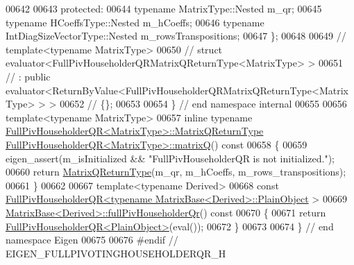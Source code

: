 \begin{DoxyCode}
00642 
00643 \textcolor{keyword}{protected}:
00644   \textcolor{keyword}{typename} MatrixType::Nested m\_qr;
00645   \textcolor{keyword}{typename} HCoeffsType::Nested m\_hCoeffs;
00646   \textcolor{keyword}{typename} IntDiagSizeVectorType::Nested m\_rowsTranspositions;
00647 \};
00648 
00649 \textcolor{comment}{// template<typename MatrixType>}
00650 \textcolor{comment}{// struct evaluator<FullPivHouseholderQRMatrixQReturnType<MatrixType> >}
00651 \textcolor{comment}{//  : public evaluator<ReturnByValue<FullPivHouseholderQRMatrixQReturnType<MatrixType> > >}
00652 \textcolor{comment}{// \{\};}
00653 
00654 \} \textcolor{comment}{// end namespace internal}
00655 
00656 \textcolor{keyword}{template}<\textcolor{keyword}{typename} MatrixType>
00657 \textcolor{keyword}{inline} \textcolor{keyword}{typename} \hyperlink{group___q_r___module_class_eigen_1_1_full_piv_householder_q_r}{FullPivHouseholderQR<MatrixType>::MatrixQReturnType}
       \hyperlink{group___q_r___module_ad26dd2d3c002939771d2375e4e051c28}{FullPivHouseholderQR<MatrixType>::matrixQ}()\textcolor{keyword}{ const}
00658 \textcolor{keyword}{}\{
00659   eigen\_assert(m\_isInitialized && \textcolor{stringliteral}{"FullPivHouseholderQR is not initialized."});
00660   \textcolor{keywordflow}{return} \hyperlink{group___q_r___module_struct_eigen_1_1internal_1_1_full_piv_householder_q_r_matrix_q_return_type}{MatrixQReturnType}(m\_qr, m\_hCoeffs, m\_rows\_transpositions);
00661 \}
00662 
00667 \textcolor{keyword}{template}<\textcolor{keyword}{typename} Derived>
00668 \textcolor{keyword}{const} \hyperlink{group___q_r___module_class_eigen_1_1_full_piv_householder_q_r}{FullPivHouseholderQR<typename MatrixBase<Derived>::PlainObject}
      >
00669 \hyperlink{group___core___module_a863bc0e06b641a089508eabec6835ab2}{MatrixBase<Derived>::fullPivHouseholderQr}()\textcolor{keyword}{ const}
00670 \textcolor{keyword}{}\{
00671   \textcolor{keywordflow}{return} \hyperlink{group___q_r___module_class_eigen_1_1_full_piv_householder_q_r}{FullPivHouseholderQR<PlainObject>}(eval());
00672 \}
00673 
00674 \} \textcolor{comment}{// end namespace Eigen}
00675 
00676 \textcolor{preprocessor}{#endif // EIGEN\_FULLPIVOTINGHOUSEHOLDERQR\_H}
\end{DoxyCode}

